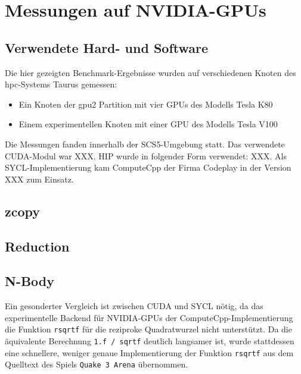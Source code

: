 \section{Messungen auf NVIDIA-GPUs}
\label{nvidia}

\subsection{Verwendete Hard- und Software}

Die hier gezeigten Benchmark-Ergebnisse wurden auf verschiedenen Knoten des
\gls{hpc}-Systems Taurus gemessen:

\begin{itemize}
    \item Ein Knoten der gpu2 Partition mit vier GPUs des Modells Tesla K80
    \item Einem experimentellen Knoten mit einer GPU des Modells Tesla V100 
\end{itemize}

Die Messungen fanden innerhalb der SCS5-Umgebung statt. Das verwendete
CUDA-Modul war XXX. HIP wurde in folgender Form verwendet: XXX. Als
SYCL-Implementierung kam ComputeCpp der Firma Codeplay in der Version XXX zum
Einsatz.

\subsection{zcopy}

\subsection{Reduction}

\subsection{N-Body}

Ein gesonderter Vergleich ist zwischen CUDA und SYCL nötig, da das
experimentelle Backend für NVIDIA-GPUs der ComputeCpp-Implementierung die
Funktion \texttt{rsqrtf} für die reziproke Quadratwurzel nicht unterstützt. Da
die äquivalente Berechnung \texttt{1.f / sqrtf} deutlich langsamer ist, wurde
stattdessen eine schnellere, weniger genaue Implementierung der Funktion
\texttt{rsqrtf} aus dem Quelltext des Spiels \texttt{Quake 3 Arena} übernommen.
